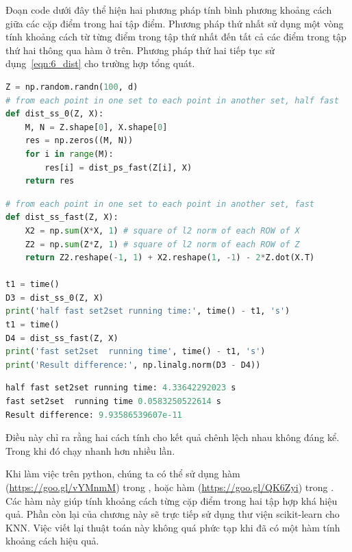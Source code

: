 Đoạn code dưới đây thể hiện hai phương pháp tính bình phương khoảng cách giữa
các cặp điểm trong hai tập điểm. Phương pháp thứ nhất sử dụng một vòng
 tính khoảng cách từ từng điểm trong tập thứ nhất đến tất cả
các điểm trong tập thứ hai thông qua hàm
 ở trên. Phương pháp thứ hai tiếp tục sử
dụng~\eqref{eqn:6_dist} cho trường hợp tổng quát.


\begin{lstlisting}[language=Python]
Z = np.random.randn(100, d)
# from each point in one set to each point in another set, half fast
def dist_ss_0(Z, X):
    M, N = Z.shape[0], X.shape[0]
    res = np.zeros((M, N))
    for i in range(M):
        res[i] = dist_ps_fast(Z[i], X)
    return res
\end{lstlisting}

\par
\par
\begin{lstlisting}[language=Python]
# from each point in one set to each point in another set, fast
def dist_ss_fast(Z, X):
    X2 = np.sum(X*X, 1) # square of l2 norm of each ROW of X
    Z2 = np.sum(Z*Z, 1) # square of l2 norm of each ROW of Z
    return Z2.reshape(-1, 1) + X2.reshape(1, -1) - 2*Z.dot(X.T)

t1 = time()
D3 = dist_ss_0(Z, X)
print('half fast set2set running time:', time() - t1, 's')
t1 = time()
D4 = dist_ss_fast(Z, X)
print('fast set2set  running time', time() - t1, 's')
print('Result difference:', np.linalg.norm(D3 - D4))
\end{lstlisting}
\kq
\begin{lstlisting}[language=Python]
half fast set2set running time: 4.33642292023 s
fast set2set  running time 0.0583250522614 s
Result difference: 9.93586539607e-11
\end{lstlisting}
Điều này chỉ ra rằng hai cách tính cho kết quả chênh lệch nhau không đáng kể.
Trong khi đó  chạy nhanh hơn
 nhiều lần.

Khi làm việc trên python, chúng ta có thể sử dụng hàm
 (\url{https://goo.gl/vYMnmM}) trong
, hoặc hàm
 (\url{https://goo.gl/QK6Zyi}) trong
. Các hàm này giúp tính khoảng cách từng
cặp điểm trong hai tập hợp khá hiệu quả. Phần còn lại của chương này sẽ trực
tiếp sử dụng thư viện scikit-learn cho KNN. Việc viết lại thuật toán này không
quá phức tạp khi đã có một hàm tính khoảng cách hiệu quả.

